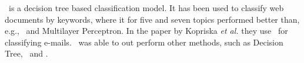 \rf\ is a decision tree based classification model. It has been used to classify web documents by keywords, where it for five and seven topics performed better than, e.g., \nb\ and Multilayer Perceptron. In the paper by Kopriska \emph{et al.} they use \rf\ for classifying e-mails. \rf\ was able to out perform other methods, such as Decision Tree, \svm\ and \nb. \cite{keywords}\cite{email}